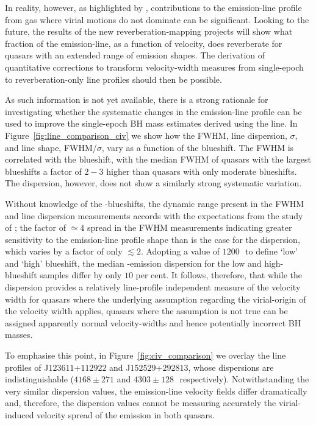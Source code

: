 In reality, however, as highlighted by \citet{denney12}, contributions to the  emission-line profile from gas where virial motions do not dominate can be significant. 
Looking to the future, the results of the new reverberation-mapping projects \citep{shen15, kingoz15} will show what fraction of the  emission-line, as a function of velocity, does reverberate for quasars with an extended range of  emission shapes. 
The derivation of quantitative corrections to transform velocity-width measures from single-epoch to reverberation-only line profiles should then be possible. 

As such information is not yet available, there is a strong rationale for investigating whether the systematic changes in the  emission-line profile can be used to improve the single-epoch BH mass estimates derived using the  line. 
In Figure~\ref{fig:line_comparison_civ} we show how the  FWHM, line dispersion, $\sigma$, and line shape, FWHM/$\sigma$, vary as a function of the blueshift. 
The  FWHM is correlated with the blueshift, with the median FWHM of quasars with the largest blueshifts a factor of $2-3$ higher than quasars with only moderate blueshifts.
The dispersion, however, does not show a similarly strong systematic variation. 

Without knowledge of the -blueshifts, the dynamic range present in the FWHM and line dispersion measurements accords with the expectations from the study of \citet{denney13}; the factor of $\simeq4$ spread in the FWHM measurements indicating greater sensitivity to the emission-line profile shape than is the case for the dispersion, which varies by a factor of only $\lesssim2$.
Adopting a value of $1200$\,\kms\, to define `low' and `high' blueshift, the median -emission dispersion for the low and high-blueshift samples differ by only $10$ per cent. 
It follows, therefore, that while the dispersion provides a relatively line-profile independent measure of the velocity width for quasars where the underlying assumption regarding the virial-origin of the velocity width applies, quasars where the assumption is not true can be assigned apparently normal velocity-widths and hence potentially incorrect BH masses. 

To emphasise this point, in Figure~\ref{fig:civ_comparison} we overlay the  line profiles of J$123611$+$112922$ and J$152529$+$292813$, whose dispersions are indistinguishable ($4168\pm271$ and $4303\pm128$\,\kms\, respectively). 
Notwithstanding the very similar dispersion values, the emission-line velocity fields differ dramatically and, therefore, the dispersion values cannot be measuring accurately the virial-induced velocity spread of the  emission in both quasars.

